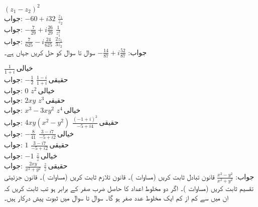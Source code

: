 \quad
$(z_1-z_2)^2$\\
جواب:\quad
$-60+i32$
\quad
$\tfrac{z_1}{z_2}$\\
جواب:\quad
$-\tfrac{7}{29}+i\tfrac{26}{29}$
\quad
$\tfrac{1}{z^2_1}$\\
جواب:\quad
$\tfrac{7}{625}-i\tfrac{24}{625}$
\quad
$\tfrac{2z_1}{3z_2}$\\
جواب:\quad
$-\tfrac{14}{87}+i\tfrac{52}{87}$
سوال  تا سوال  کو حل کریں جہاں  ہے۔

\quad
$\tfrac{1}{1+i}\,\text{خیالی}$\\
جواب:\quad
$-\tfrac{1}{2}$
\quad
$\tfrac{1-i}{1+i}\,\text{حقیقی}$\\
جواب:\quad
$0$
\quad
$z^2\,\text{خیالی}$\\
جواب:\quad
$2xy$
\quad
$z^3\,\text{حقیقی}$\\
جواب:\quad
$x^3-3xy^2$
\quad
$z^4\,\text{خیالی}$\\
جواب:\quad
$4xy(x^2-y^2)$
\quad
$\tfrac{(-1+i)^2}{-5+i4}\,\text{حقیقی}$\\
جواب:\quad
$-\tfrac{8}{41}$
\quad
$\tfrac{3-i7}{-5+i2}\,\text{خیالی}$\\
جواب:\quad
$1$
\quad
$\tfrac{3-i7}{-5+i2}\,\text{حقیقی}$\\
جواب:\quad
$-1$
\quad
$\tfrac{z}{\bar{z}}\,\text{خیالی}$\\
جواب:\quad
$\tfrac{2xy}{x^2+y^2}$
\quad
$\tfrac{z}{\bar{z}}\,\text{حقیقی}$\\
جواب:\quad
$\tfrac{x^2-y^2}{x^2+y^2}$
\quad
قانون تبادل ثابت کریں (مساوات )۔
\quad
قانون تلازم ثابت کریں (مساوات )۔
\quad
قانون جزئیتی تقسیم ثابت کریں (مساوات )۔
\quad
اگر دو مخلوط اعداد کا حاصل ضرب صفر کے برابر ہو تب ثابت کریں کہ ان میں سے کم از کم ایک مخلوط عدد صفر ہو گا۔ 
سوال  تا سوال  میں ثبوت پیش درکار ہیں۔

